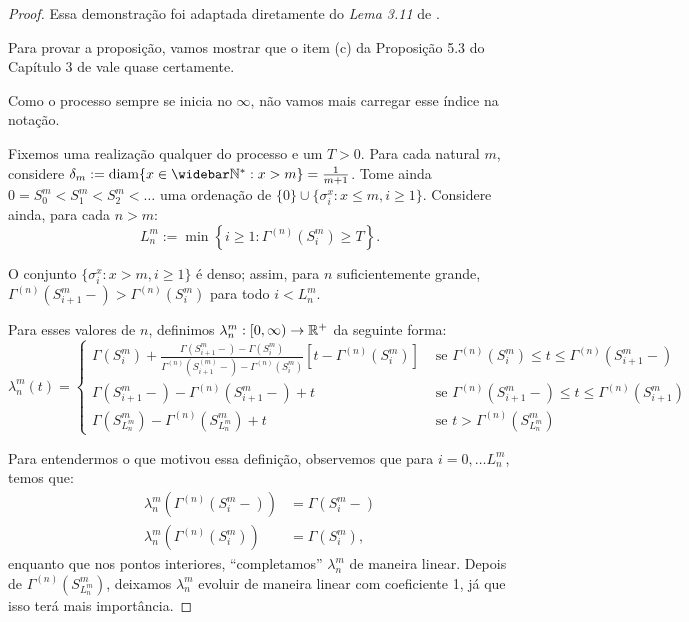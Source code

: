 \begin{proof}
  Essa demonstração foi adaptada diretamente do \emph{Lema 3.11} de
  \cite{fontes:08}.

  Para provar a proposição, vamos mostrar que o item (c) da Proposição
  5.3 do Capítulo 3 de \cite{ethier:86} vale quase certamente.

  Como o processo sempre se inicia no $\infty$, não vamos mais
  carregar esse índice na notação.

  Fixemos uma realização qualquer do processo e um $T >
  0$. Para cada natural $m$, considere $\delta_m := \diam\{ x \in
  \Nzb: x > m \} = \frac{1}{m+1}$. Tome ainda $0 = S_0^m < S_1^m <
  S_2^m < \ldots $ uma ordenação de $\{0\}\cup\{ \sigma^x_i : x \leq
  m, i \geq 1\}$. Considere ainda, para cada $n > m$:
  \begin{displaymath}
    L^m_n := \min \left\{ i \geq 1: \Gamma^{(n)}(S^m_i) \geq T \right\}.
  \end{displaymath}

  O conjunto $\{\sigma_i^x: x > m, i\geq 1\}$ é denso; assim, para $n$
  suficientemente grande, $\Gamma^{(n)}(S^m_{i+1}-) >
  \Gamma^{(n)}(S^m_i)$ para todo $i < L^m_n$.

  Para esses valores de $n$, definimos $\lambda_n^m: [0, \infty) \to
  {\mathbb{R}}^+$ da seguinte forma:
  \begin{displaymath}
    \lambda_n^m(t) = \begin{cases}
      \Gamma(S_i^m) + \frac{\Gamma(S_{i+1}^m-) - \Gamma(S_i^m)}
      {\Gamma^{(n)}(S_{i+1}^{(m)} -) - \Gamma^{(n)}(S_i^m)}
      \left[t - \Gamma^{(n)}(S_i^m)\right]
      & \textrm{ se }
      \Gamma^{(n)}(S_i^m) \leq t \leq \Gamma^{(n)}(S_{i+1}^m-) \\
      \Gamma(S_{i+1}^m-) - \Gamma^{(n)}(S_{i+1}^m-) + t
      & \textrm{ se }
      \Gamma^{(n)}(S_{i+1}^m-) \leq t \leq \Gamma^{(n)}(S_{i+1}^m)\\
      \Gamma(S^m_{L_n^m}) - \Gamma^{(n)}(S^m_{L_n^m}) + t
      & \textrm{ se } t > \Gamma^{(n)}(S^m_{L_n^m})
    \end{cases}
  \end{displaymath}

  Para entendermos o que motivou essa definição, observemos que para $i =
  0, \ldots L_n^m$, temos que:
  \begin{align*}
    \lambda_n^m(\Gamma^{(n)}(S_i^m-)) &= \Gamma(S_i^m-)\\
    \lambda_n^m(\Gamma^{(n)}(S_i^m)) &= \Gamma(S_i^m),
  \end{align*}
  enquanto que nos pontos interiores, ``completamos'' $\lambda_n^m$ de
  maneira linear. Depois de $\Gamma^{(n)}(S^m_{L_n^m})$, deixamos
  $\lambda_n^m$ evoluir de maneira linear com coeficiente 1, já que
  isso terá mais importância.


\end{proof}
